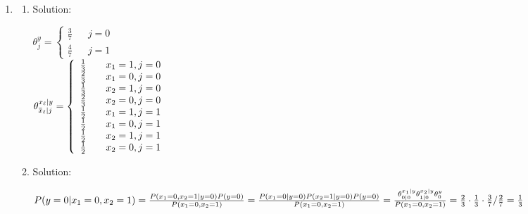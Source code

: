 \documentclass[12pt]{article}
\newcommand{\solu}{{\color{blue} Solution:}}
\newcommand{\overbar}[1]{\mkern 1.5mu\overline{\mkern-1.5mu#1\mkern-1.5mu}\mkern 1.5mu}
\begin{document}
\begin{enumerate}
        \item \begin{enumerate}
            \item \solu 
        
            $\theta^y_j = \left\{
                \begin{array}{rcl}
                    \frac{3}{7} & & j = 0\\
                    \frac{4}{7} & & j = 1
                \end{array}
            \right.$\\
            $\theta^{x_\ell | y}_{\overbar{x}_\ell | j} = \left\{
                \begin{array}{rcl}
                    \frac{1}{3} & & x_1 = 1, j = 0\\
                    \frac{2}{3} & & x_1 = 0, j = 0\\
                    \frac{1}{3} & & x_2 = 1, j = 0\\
                    \frac{2}{3} & & x_2 = 0, j = 0\\
                    \frac{1}{2} & & x_1 = 1, j = 1\\
                    \frac{1}{2} & & x_1 = 0, j = 1\\
                    \frac{1}{2} & & x_2 = 1, j = 1\\
                    \frac{1}{2} & & x_2 = 0, j = 1
                \end{array}
            \right.$

            \item \solu 
            
            $P(y = 0 | x_1 = 0, x_2 = 1)\\
            = \frac{P(x_1 = 0, x_2 = 1 | y = 0)P(y = 0)}{P(x_1 = 0, x_2 = 1)}\\
            = \frac{P(x_1 = 0| y = 0)P(x_2 = 1| y = 0)P(y = 0)}{P(x_1 = 0, x_2 = 1)}\\
            = \frac{\theta^{x_1 | y}_{0 | 0}\theta^{x_2 | y}_{1 | 0}\theta^y_0}{P(x_1 = 0, x_2 = 1)}\\
            = \frac{2}{3} \cdot \frac{1}{3} \cdot \frac{3}{7}  / \frac{2}{7}\\
            = \frac{1}{3}$
        \end{enumerate}

        
    \end{enumerate}    
\end{document}
